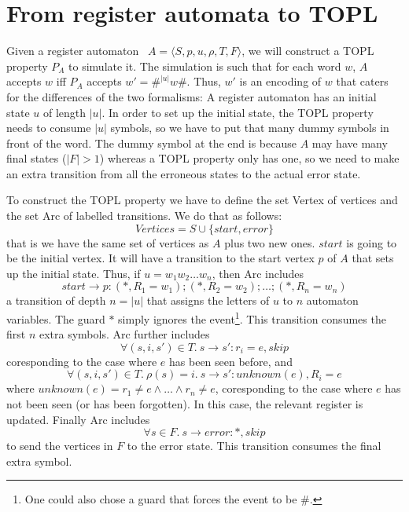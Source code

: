 \section{From register automata to TOPL}
 
Given a register automaton~\cite{dblp:journals/tcs/kaminskif94} $A=\langle S, p, u, \rho, T,
F\rangle$, we will construct a TOPL property $P_A$ to simulate it. The
simulation is such that for each word $w$, $A$ accepts $w$ iff $P_A$
accepts $w' = \#^{|u|}w\#$. Thus, $w'$ is an encoding of $w$ that
caters for the differences of the two formalisms: A register automaton has an
initial state $u$ of length $|u|$. In order to set up the initial
state, the TOPL property needs to consume $|u|$ symbols, so we have to
put that many dummy symbols in front of the word. The dummy symbol at
the end is because $A$ may have many final states ($|F| > 1$) whereas a TOPL
property only has one, so we need to make an extra transition from all
the erroneous states to the actual error state.


To construct the TOPL property we have to define the set Vertex
of vertices and the set Arc of labelled transitions. We do that as follows:
\[
Vertices = S \cup \{start, error\}
\]
that is we have the same set of vertices as $A$ plus two new
ones. $start$ is going to be the initial vertex. It will have a
transition to the start vertex $p$ of $A$ that sets up the
initial state. Thus, if $u = w_1w_2\ldots w_n$, then Arc includes
\[
start \to p: (*,R_1=w_1);(*,R_2=w_2);\ldots;(*,R_n=w_n)
\]
a transition of depth $n = |u|$ that assigns the letters of $u$
to $n$ automaton variables. The guard $*$ simply ignores the
event\footnote{One could also chose a guard that forces the event
to be \#.}. This transition consumes the first $n$ extra
symbols. Arc further includes
\[
\forall (s, i, s') \in T.\ s\to s': r_i=e, skip
\]
coresponding to the case where $e$ has been seen before, and
\[
\forall (s, i, s') \in T.\ \rho(s)=i.\ s\to s': unknown(e), R_i=e
\]
where $unknown(e) = r_1 \neq e \land \ldots \land r_n \neq e$,
coresponding to the case where $e$ has not been seen (or has been
forgotten). In this case, the relevant register is
updated. Finally Arc includes
\[
\forall s\in F.\ s\to error: *, skip
\]
to send the vertices in $F$ to the error state. This transition
consumes the final extra symbol.
